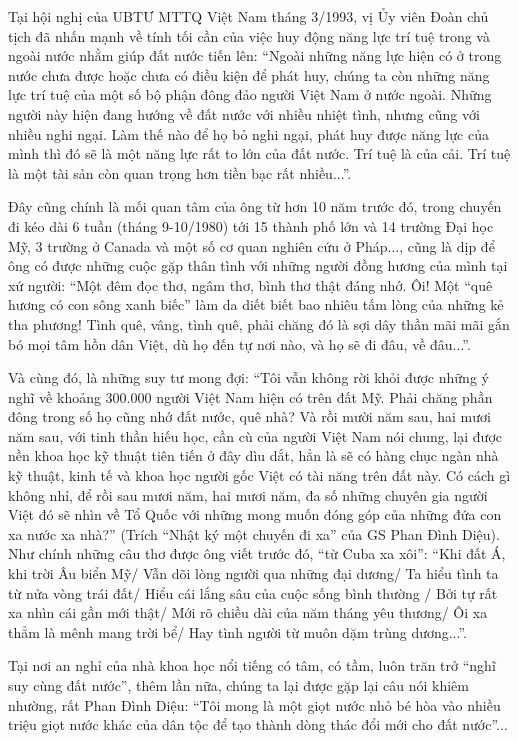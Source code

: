 Tại hội nghị của UBTƯ MTTQ Việt Nam tháng 3/1993, vị Ủy viên Đoàn chủ tịch đã nhấn mạnh về tính tối cần của việc huy động năng lực trí tuệ trong và ngoài nước nhằm giúp đất nước tiến lên: “Ngoài những năng lực hiện có ở trong nước chưa được hoặc chưa có điều kiện để phát huy, chúng ta còn những năng lực trí tuệ của một số bộ phận đông đảo người Việt Nam ở nước ngoài. Những người này hiện đang hướng về đất nước với nhiều nhiệt tình, nhưng cũng với nhiều nghi ngại. Làm thế nào để họ bỏ nghi ngại, phát huy được năng lực của mình thì đó sẽ là một năng lực rất to lớn của đất nước. Trí tuệ là của cải. Trí tuệ là một tài sản còn quan trọng hơn tiền bạc rất nhiều...”.

Đây cũng chính là mối quan tâm của ông từ hơn 10 năm trước đó, trong chuyến đi kéo dài 6 tuần (tháng 9-10/1980) tới 15 thành phố lớn và 14 trường Đại học Mỹ, 3 trường ở Canada và một số cơ quan nghiên cứu ở Pháp..., cũng là dịp để ông có được những cuộc gặp thân tình với những người đồng hương của mình tại xứ người: “Một đêm đọc thơ, ngâm thơ, bình thơ thật đáng nhớ. Ôi! Một “quê hương có con sông xanh biếc” làm da diết biết bao nhiêu tấm lòng của những kẻ tha phương! Tình quê, vâng, tình quê, phải chăng đó là sợi dây thần mãi mãi gắn bó mọi tâm hồn dân Việt, dù họ đến tự nơi nào, và họ sẽ đi đâu, về đâu...”. 

Và cùng đó, là những suy tư mong đợi: “Tôi vẫn không rời khỏi được những ý nghĩ về khoảng 300.000 người Việt Nam hiện có trên đất Mỹ. Phải chăng phần đông trong số họ cũng nhớ đất nước, quê nhà? Và rồi mười năm sau, hai mươi năm sau, với tinh thần hiếu học, cần cù của người Việt Nam nói chung, lại được nền khoa học kỹ thuật tiên tiến ở đây dìu dắt, hẳn là sẽ có hàng chục ngàn nhà kỹ thuật, kinh tế và khoa học người gốc Việt có tài năng trên đất này. Có cách gì không nhỉ, để rồi sau mươi năm, hai mươi năm, đa số những chuyên gia người Việt đó sẽ nhìn về Tổ Quốc với những mong muốn đóng góp của những đứa con xa nước xa nhà?” (Trích “Nhật ký một chuyến đi xa” của GS Phan Đình Diệu). Như chính những câu thơ được ông viết trước đó, “từ Cuba xa xôi”: “Khi đất Á, khi trời Âu biển Mỹ/ Vẫn dõi lòng người qua những đại dương/ Ta hiểu tình ta từ nửa vòng trái đất/ Hiểu cái lắng sâu của cuộc sống bình thường / Bởi tự rất xa nhìn cái gần mới thật/ Mới rõ chiều dài của năm tháng yêu thương/ Ôi xa thẳm là mênh mang trời bể/ Hay tình người từ muôn dặm trùng dương...”.

Tại nơi an nghỉ của nhà khoa học nổi tiếng có tâm, có tầm, luôn trăn trở “nghĩ suy cùng đất nước”, thêm lần nữa, chúng ta lại được gặp lại câu nói khiêm nhường, rất Phan Đình Diệu: “Tôi mong là một giọt nước nhỏ bé hòa vào nhiều triệu giọt nước khác của dân tộc để tạo thành dòng thác đổi mới cho đất nước”...


